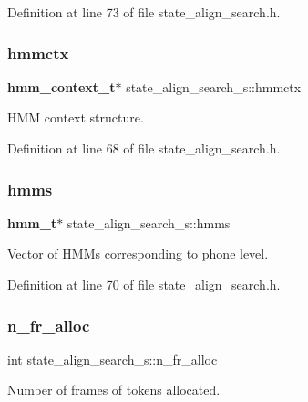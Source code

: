 Definition at line 73 of file state\+\_\+align\+\_\+search.\+h.

\mbox{\label{structstate__align__search__s_a683e76dbcc87cde89ca5d45b4b91c1e9}} 
\subsubsection{hmmctx}
{\footnotesize\ttfamily \textbf{ hmm\+\_\+context\+\_\+t}$\ast$ state\+\_\+align\+\_\+search\+\_\+s\+::hmmctx}



H\+MM context structure. 



Definition at line 68 of file state\+\_\+align\+\_\+search.\+h.

\mbox{\label{structstate__align__search__s_a78ea3ffae6ecc3c004ff60707dc225b0}} 
\subsubsection{hmms}
{\footnotesize\ttfamily \textbf{ hmm\+\_\+t}$\ast$ state\+\_\+align\+\_\+search\+\_\+s\+::hmms}



Vector of H\+M\+Ms corresponding to phone level. 



Definition at line 70 of file state\+\_\+align\+\_\+search.\+h.

\mbox{\label{structstate__align__search__s_a97956b4924cba2b37470ff17f29c37bb}} 
\subsubsection{n\+\_\+fr\+\_\+alloc}
{\footnotesize\ttfamily int state\+\_\+align\+\_\+search\+\_\+s\+::n\+\_\+fr\+\_\+alloc}



Number of frames of tokens allocated. 



